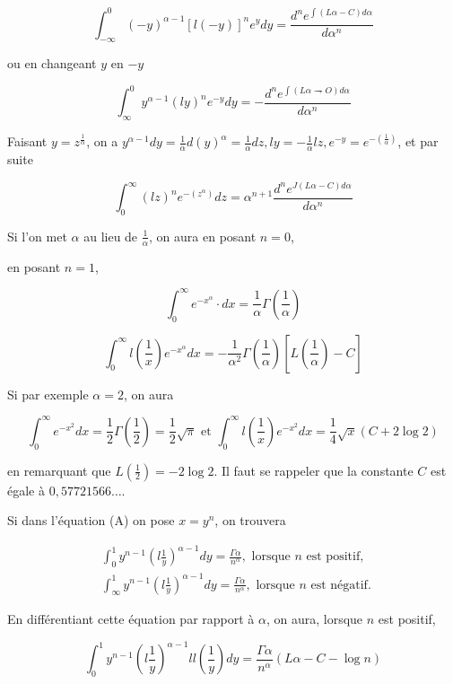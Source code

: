 \documentclass{article}
\begin{document}
\[
\int_{-\infty}^{0}(-y)^{\alpha-1}[l(-y)]^{n} e^{y} d y=\frac{d^{n} e^{\int(L \alpha-C) d \alpha}}{d \alpha^{n}}
\]

ou en changeant \(y\) en \(-y\)

\[
\int_{\infty}^{0} y^{\alpha-1}(l y)^{n} e^{-y} d y=-\frac{d^{n} e^{\int(L \alpha \rightharpoondown O) d \alpha}}{d \alpha^{n}}
\]

Faisant \(y=z^{\frac{1}{\alpha}}\), on a \(y^{\alpha-1} d y=\frac{1}{\alpha} d(y)^{\alpha}=\frac{1}{\alpha} d z, l y=-\frac{1}{\alpha} l z, e^{-y}=e^{-\left(\frac{1}{\alpha}\right)}\), et par suite

\[
\int_{0}^{\infty}(l z)^{n} e^{-\left(z^{\alpha}\right)} d z=\alpha^{n+1} \frac{d^{n} e^{J(L \alpha-C) d \alpha}}{d \alpha^{n}}
\]

Si l'on met \(\alpha\) au lieu de \(\frac{1}{\alpha}\), on aura en posant \(n=0\),

en posant \(n=1\),

\[
\int_{0}^{\infty} e^{-x^{\alpha}} \cdot d x=\frac{1}{\alpha} \Gamma\left(\frac{1}{\alpha}\right)
\]

\[
\int_{0}^{\infty} l\left(\frac{1}{x}\right) e^{-x^{\alpha}} d x=-\frac{1}{\alpha^{2}} \Gamma\left(\frac{1}{\alpha}\right)\left[L\left(\frac{1}{\alpha}\right)-C\right]
\]

Si par exemple \(\alpha=2\), on aura

\[
\int_{0}^{\infty} e^{-x^{2}} d x=\frac{1}{2} \Gamma\left(\frac{1}{2}\right)=\frac{1}{2} \sqrt{\pi} \text { et } \int_{0}^{\infty} l\left(\frac{1}{x}\right) e^{-x^{2}} d x=\frac{1}{4} \sqrt{x}(C+2 \log 2)
\]

en remarquant que \(L\left(\frac{1}{2}\right)=-2 \log 2\). Il faut se rappeler que la constante \(C\) est égale à \(0,57721566 \ldots\).

Si dans l'équation (A) on pose \(x=y^{n}\), on trouvera

\[
\begin{aligned}
& \int_{0}^{1} y^{n-1}\left(l \frac{1}{y}\right)^{\alpha-1} d y=\frac{\Gamma \alpha}{n^{\alpha}}, \text { lorsque } n \text { est positif, } \\
& \int_{\infty}^{1} y^{n-1}\left(l \frac{1}{y}\right)^{\alpha-1} d y=\frac{\Gamma \alpha}{n^{\alpha}}, \text { lorsque } n \text { est négatif. }
\end{aligned}
\]

En différentiant cette équation par rapport à \(\alpha\), on aura, lorsque \(n\) est positif,

\[
\int_{0}^{1} y^{n-1}\left(l \frac{1}{y}\right)^{\alpha-1} l l\left(\frac{1}{y}\right) d y=\frac{\Gamma \alpha}{n^{\alpha}}(L \alpha-C-\log n)
\]
\end{document}
